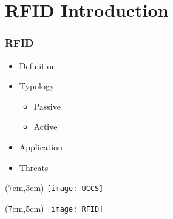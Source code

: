 \section{RFID Introduction}
\begin{frame}
  \frametitle{RFID}

  \begin{itemize}
   \item Definition
   \item Typology
   \begin{itemize}
    \item Passive
    \item Active
   \end{itemize}
   \item Application
   \item Threats
  \end{itemize}

 \begin{textblock*}{5cm}(7cm,3cm)
  \texttt{[image: UCCS]}
 \end{textblock*}

 \begin{textblock*}{5cm}(7cm,5cm)
  \texttt{[image: RFID]}
 \end{textblock*}


\end{frame}
